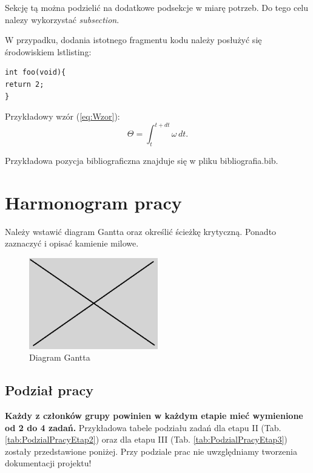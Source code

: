 \documentclass[10pt, a4paper]{article}
\begin{document}
Sekcję tą można podzielić na dodatkowe podsekcje w miarę potrzeb. 
Do tego celu nalezy wykorzystać \textit{subsection}.

W przypadku, dodania istotnego fragmentu kodu należy posłużyć się środowiskiem 
lstlisting:

\begin{lstlisting}[tabsize=2]
int foo(void){
return 2;
}
\end{lstlisting}

Przykładowy wzór (\ref{eq:Wzor}):
\begin{equation}
\label{eq:Wzor}
\Theta = \int_t^{t+dt} \omega \, dt.	
\end{equation}

Przykładowa pozycja bibliograficzna \cite{SR01} znajduje się 
w pliku bibliografia.bib.

\section{Harmonogram pracy}

Należy wstawić diagram Gantta oraz określić ścieżkę 
krytyczną. Ponadto zaznaczyć i opisać kamienie milowe.

\begin{figure}[H]
	\centering
	\includegraphics[width=0.5\textwidth]{figures/obraz.png}
	\caption{Diagram Gantta}
	\label{fig:DiagramGantta}
\end{figure}

\subsection{Podział pracy}

\textbf{Każdy z członków grupy powinien w każdym etapie mieć wymienione od 2 do 4 zadań.}
Przykładowa tabele podziału zadań dla etapu II 
(Tab. \ref{tab:PodzialPracyEtap2}) oraz dla etapu III 
(Tab. \ref{tab:PodzialPracyEtap3})
zostały przedstawione poniżej. 
Przy podziale prac nie uwzględniamy tworzenia dokumentacji projektu!
\end{document}
